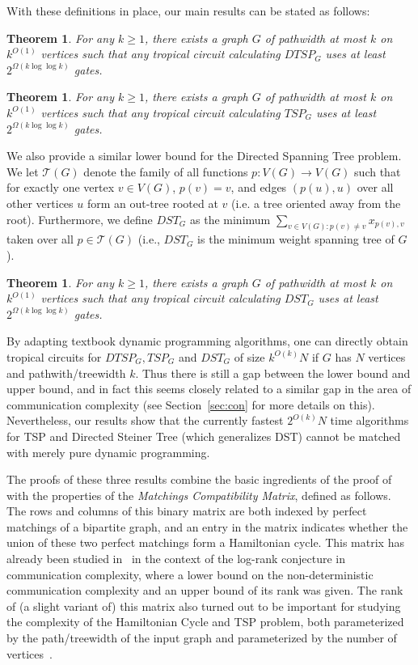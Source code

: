 \documentclass[11pt,a4paper]{article}
\newtheorem{theorem}[lemma]{Theorem}
\begin{document}
With these definitions in place, our main results can be stated as follows:
\begin{theorem}\label{thm:main_dtsp}
    For any $k \geq 1$, there exists a graph $G$ of pathwidth at most $k$ on $k^{O(1)}$ vertices such that any tropical circuit calculating $DTSP_G$ uses at least $2^{\Omega(k \log \log k)}$ gates.
\end{theorem}

\begin{theorem}\label{thm:main_tsp}
    For any $k \geq 1$, there exists a graph $G$ of pathwidth at most $k$ on $k^{O(1)}$ vertices such that any tropical circuit calculating $TSP_{G}$ uses at least $2^{\Omega(k \log \log k)}$ gates.
\end{theorem}
We also provide a similar lower bound for the Directed Spanning Tree problem.
We let $\mathcal{T}(G)$ denote the family of all functions $p : V(G) \to V(G)$ such that for exactly one vertex $v \in V(G)$, $p(v) = v$, and edges $(p(u), u)$ over all other vertices $u$ form an out-tree rooted at $v$ (i.e. a tree oriented away from the root). Furthermore, we define $DST_G$ as the minimum $\sum_{v \in V(G) : p(v) \neq v} x_{p(v), v}$ taken over all $p \in \mathcal{T}(G)$ (i.e., $DST_G$ is the minimum weight spanning tree of $G$).

\begin{theorem}\label{thm:main_dst}
    For any $k \geq 1$, there exists a graph $G$ of pathwidth at most $k$ on $k^{O(1)}$ vertices such that any tropical circuit calculating $DST_{G}$ uses at least $2^{\Omega(k \log \log k)}$ gates.
\end{theorem}

By adapting textbook dynamic programming algorithms, one can directly obtain tropical circuits for $DTSP_G,TSP_G$ and $DST_G$ of size $k^{O(k)} N$ if $G$ has $N$ vertices and pathwith/treewidth $k$. Thus there is still a gap between the lower bound and upper bound, and in fact this seems closely related to a similar gap in the area of communication complexity (see Section~\ref{sec:con} for more details on this). Nevertheless, our results show that the currently fastest $2^{O(k)}N$ time algorithms for TSP and Directed Steiner Tree (which generalizes DST) cannot be matched with merely pure dynamic programming.

The proofs of these three results combine the basic ingredients of the proof of  with the properties of the \emph{Matchings Compatibility Matrix}, defined as follows. The rows and columns of this binary matrix are both indexed by perfect matchings of a bipartite graph, and an entry in the matrix indicates whether the union of these two perfect matchings form a Hamiltonian cycle. This matrix has already been studied in~\cite{raz1995log} in the context of the log-rank conjecture in communication complexity, where a lower bound on the non-deterministic communication complexity and an upper bound of its rank was given. The rank of (a slight variant of) this matrix also turned out to be important for studying the complexity of the Hamiltonian Cycle and TSP problem, both parameterized by the path/treewidth of the input graph and parameterized by the number of vertices~\cite{CurticapeanLN18,CyganKN18,Nederlof20}.
\end{document}

